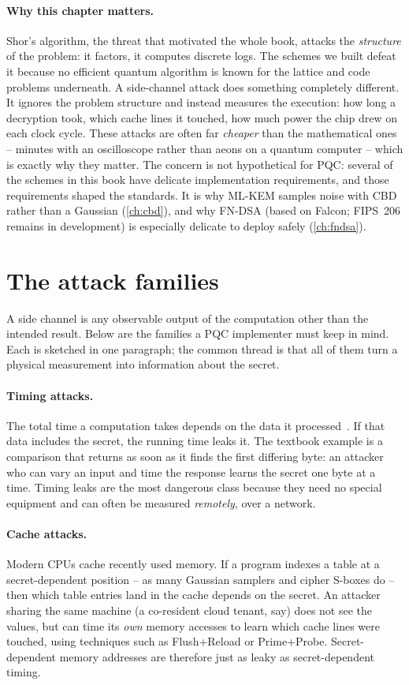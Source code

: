 \paragraph{Why this chapter matters.}
Shor's algorithm, the threat that motivated the whole book, attacks the
\emph{structure} of the problem: it factors, it computes discrete logs. The schemes
we built defeat it because no efficient quantum algorithm is known for the lattice
and code problems underneath. A side-channel attack does something completely
different. It ignores the problem structure and instead measures the execution:
how long a decryption took, which cache lines it touched, how much power the chip
drew on each clock cycle. These attacks are often far \emph{cheaper} than the
mathematical ones -- minutes with an oscilloscope rather than aeons on a quantum
computer -- which is exactly why they matter. The concern is not hypothetical for
PQC: several of the schemes in this book have delicate implementation requirements,
and those requirements shaped the standards. It is why ML-KEM samples noise with CBD
rather than a Gaussian (\ref{ch:cbd}), and why FN-DSA (based on Falcon; FIPS~206
remains in development) is especially delicate to deploy safely (\ref{ch:fndsa}).

\section{The attack families}

A side channel is any observable output of the computation other than the intended
result. Below are the families a PQC implementer must keep in mind. Each is sketched
in one paragraph; the common thread is that all of them turn a physical measurement
into information about the secret.

\paragraph{Timing attacks.}
The total time a computation takes depends on the data it processed~\cite{kocher1996}. If that data
includes the secret, the running time leaks it. The textbook example is a
comparison that returns as soon as it finds the first differing byte: an attacker
who can vary an input and time the response learns the secret one byte at a time.
Timing leaks are the most dangerous class because they need no special equipment
and can often be measured \emph{remotely}, over a network.

\paragraph{Cache attacks.}
Modern CPUs cache recently used memory. If a program indexes a table at a
secret-dependent position -- as many Gaussian samplers and cipher S-boxes do -- then
which table entries land in the cache depends on the secret. An attacker sharing the
same machine (a co-resident cloud tenant, say) does not see the values, but can time
its \emph{own} memory accesses to learn which cache lines were touched, using
techniques such as Flush+Reload or Prime+Probe. Secret-dependent memory addresses are
therefore just as leaky as secret-dependent timing.

